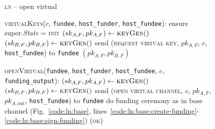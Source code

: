 \begin{figure}[H]
  \begin{processbox}{\textsc{ln} -- open virtual}
    \begin{algorithmic}[1]
      \State \textsc{virtualKeys}($c$, \texttt{fundee}, \texttt{host\_funder},
      \texttt{host\_fundee}):
      \Indent
        \State ensure super.\textit{State} = \textsc{init} 
        \State $(sk_{A, F}, pk_{A, F}) \gets \textsc{keyGen}()$
          \State $(sk_{B, F}, pk_{B, F}) \gets \textsc{keyGen}()$
        \Else \: 
          \State send (\textsc{request virtual key}, $pk_{A, F}$, $c$,
          \texttt{host\_fundee}) to \texttt{fundee}
          \State {}
          \State {}
          \State {}
          \State {}
        \EndIf
        \State \Return $(pk_{A, F}, pk_{B, F})$
      \EndIndent
      \Statex

      \State \textsc{openVirtual}(\texttt{fundee}, \texttt{host\_funder},
      \texttt{host\_fundee}, $c$, \texttt{funding\_output}): 
      \Indent
        \State $(sk_{A, F}, pk_{A, F}) \gets \textsc{keyGen}()$
          \State $(sk_{B, F}, pk_{B, F}) \gets \textsc{keyGen}()$
        \Else \: 
          \State send (\textsc{open virtual channel}, $c$, $pk_{A, F}$, $pk_{A,
          \mathrm{out}}$, \texttt{host\_fundee}) to \texttt{fundee}
          \State {}
          \State {}
          \State {}
          \State {}
          \State {}
        \EndIf
          \State do funding ceremony as in base channel
          (Fig.~\ref{code:ln:base},
          lines~\ref{code:ln:base:create-funding}-\ref{code:ln:base:sign-funding})
        \EndIf
        \State \Return (\textsc{ok})
      \EndIndent
    \end{algorithmic}
  \end{processbox}
  \caption{}
  \label{code:ln:open-virtual}
\end{figure}

